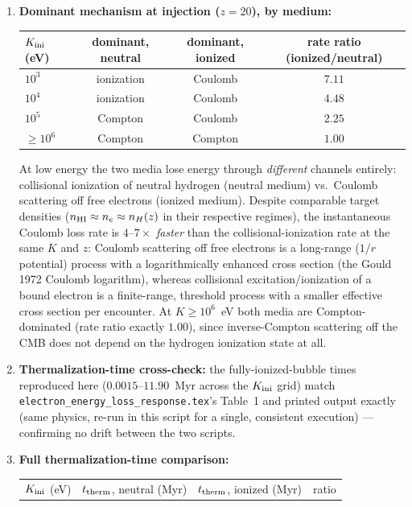 \documentclass[11pt,a4paper]{article}
\begin{document}
\begin{enumerate}
\item \textbf{Dominant mechanism at injection ($z=20$), by medium:}
\begin{center}
\begin{tabular}{@{}lccc@{}}
\toprule
$K_{\rm ini}$ (eV) & dominant, neutral & dominant, ionized & rate ratio (ionized/neutral) \\
\midrule
$10^3$ & ionization & Coulomb & $7.11$ \\
$10^4$ & ionization & Coulomb & $4.48$ \\
$10^5$ & Compton    & Coulomb & $2.25$ \\
$\ge10^6$ & Compton & Compton & $1.00$ \\
\bottomrule
\end{tabular}
\end{center}
      At low energy the two media lose energy through \emph{different} channels entirely: collisional
      ionization of neutral hydrogen (neutral medium) vs.\ Coulomb scattering off free electrons (ionized
      medium). Despite comparable target densities ($n_{\rm HI}\approx n_e\approx n_H(z)$ in their
      respective regimes), the instantaneous Coulomb loss rate is $4$--$7\times$ \emph{faster} than the
      collisional-ionization rate at the same $K$ and $z$: Coulomb scattering off free electrons is a
      long-range ($1/r$ potential) process with a logarithmically enhanced cross section (the Gould 1972
      Coulomb logarithm), whereas collisional excitation/ionization of a bound electron is a
      finite-range, threshold process with a smaller effective cross section per encounter. At
      $K\ge10^6$~eV both media are Compton-dominated (rate ratio exactly $1.00$), since inverse-Compton
      scattering off the CMB does not depend on the hydrogen ionization state at all.
\item \textbf{Thermalization-time cross-check:} the fully-ionized-bubble times reproduced here
      ($0.0015$--$11.90$~Myr across the $K_{\rm ini}$ grid) match
      \texttt{electron\_energy\_loss\_response.tex}'s Table~1 and printed output exactly (same physics,
      re-run in this script for a single, consistent execution) --- confirming no drift between the two
      scripts.
\item \textbf{Full thermalization-time comparison:}
\begin{center}
\begin{tabular}{@{}lccc@{}}
\toprule
$K_{\rm ini}$ (eV) & $t_{\rm therm}$, neutral (Myr) & $t_{\rm therm}$, ionized (Myr) & ratio \\

\end{tabular}
\end{center}
\end{enumerate}
\end{document}

